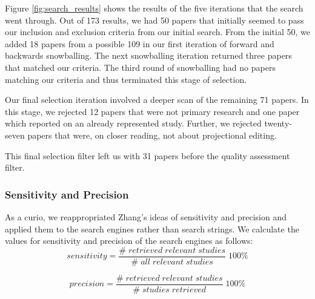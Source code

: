 Figure \ref{fig:search_results} shows the results of the five iterations that the search went through.
Out of 173 results, we had 50 papers that initially seemed to pass our inclusion and exclusion criteria from our initial search.
From the initial 50, we added 18 papers from a possible 109 in our first iteration of forward and backwards snowballing.
The next snowballing iteration returned three papers that matched our criteria.
The third round of snowballing had no papers matching our criteria and thus terminated this stage of selection.

Our final selection iteration involved a deeper scan of the remaining 71 papers.
In this stage, we rejected 12 papers that were not primary research and one paper which reported on an already represented study.
Further, we rejected twenty-seven papers that were, on closer reading, not about projectional editing.

This final selection filter left us with 31 papers before the quality assessment filter. 

\subsubsection{Sensitivity and Precision}
As a curio, we reappropriated Zhang's\cite{Zhang_2011} ideas of sensitivity and precision and applied them to the search engines rather than search strings.
We calculate the values for sensitivity and precision of the search engines as follows:
\[
        sensitivity = \frac{\#\;retrieved\;relevant\;studies}{\#\;all\;relevant\;studies} \;100\%
\]

\[
        precision = \frac{\#\;retrieved\;relevant\;studies}{\#\;studies\;retrieved} \;100\%
\]

